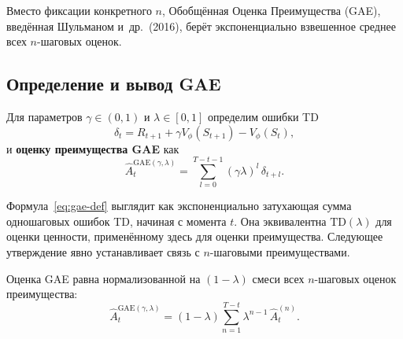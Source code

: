 Вместо фиксации конкретного $n$, Обобщённая Оценка Преимущества (GAE), введённая Шульманом и~др.~(2016), берёт экспоненциально взвешенное среднее всех $n$-шаговых оценок.

\subsection{Определение и вывод GAE}

\begin{definition}
\label{def:gae-ch9}
Для параметров $\gamma \in (0,1)$ и $\lambda \in [0,1]$ определим ошибки TD
\[
\delta_t = R_{t+1} + \gamma V_\phi(S_{t+1}) - V_\phi(S_t),
\]
и \textbf{оценку преимущества GAE} как
\begin{equation}
\label{eq:gae-def}
\hat{A}_t^{\mathrm{GAE}(\gamma,\lambda)}
= \sum_{l=0}^{T-t-1} (\gamma\lambda)^l\,\delta_{t+l}.
\end{equation}
\end{definition}

Формула~\eqref{eq:gae-def} выглядит как экспоненциально затухающая сумма одношаговых ошибок TD, начиная с момента $t$. Она эквивалентна $\mathrm{TD}(\lambda)$ для оценки ценности, применённому здесь для оценки преимущества. Следующее утверждение явно устанавливает связь с $n$-шаговыми преимуществами.

\begin{proposition}
\label{prop:gae-nstep}
Оценка GAE равна нормализованной на $(1-\lambda)$ смеси всех $n$-шаговых оценок преимущества:
\begin{equation}
\label{eq:gae-nstep}
\hat{A}_t^{\mathrm{GAE}(\gamma,\lambda)}
= (1-\lambda)\sum_{n=1}^{T-t} \lambda^{n-1}\,\hat{A}_t^{(n)}.
\end{equation}
\end{proposition}

